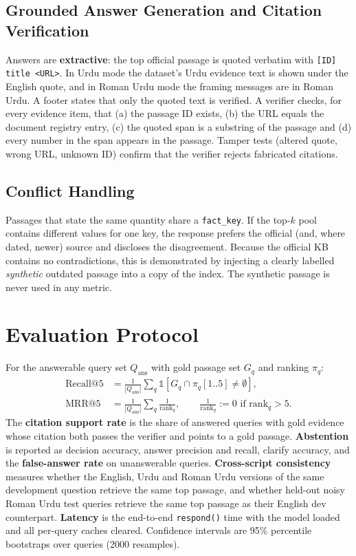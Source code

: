 \documentclass[12pt,a4paper]{article}
\begin{document}
\subsection{Grounded Answer Generation and Citation Verification}
Answers are \textbf{extractive}: the top official passage is quoted verbatim with
\texttt{[ID] title <URL>}. In Urdu mode the dataset's Urdu evidence text is shown under the English quote, and in Roman
Urdu mode the framing messages are in Roman Urdu. A footer states that only the quoted text is verified. A verifier checks,
for every evidence item, that (a) the passage ID exists, (b) the URL equals the document registry entry, (c) the quoted span
is a substring of the passage and (d) every number in the span appears in the passage. Tamper tests (altered quote, wrong
URL, unknown ID) confirm that the verifier rejects fabricated citations.

\subsection{Conflict Handling}
Passages that state the same quantity share a \texttt{fact\_key}. If the top-$k$ pool contains different values for one key,
the response prefers the official (and, where dated, newer) source and discloses the disagreement. Because the official
KB contains no contradictions, this is demonstrated by injecting a clearly labelled \emph{synthetic} outdated passage into a
copy of the index. The synthetic passage is never used in any metric.

\section{Evaluation Protocol}
For the answerable query set $Q_{\text{ans}}$ with gold passage set $G_q$ and ranking $\pi_q$:
\begin{align}
\text{Recall@5} &= \frac{1}{|Q_{\text{ans}}|}\sum_{q} \mathbb{1}\left[G_q \cap \pi_q[1..5] \neq \emptyset\right], \\
\text{MRR@5} &= \frac{1}{|Q_{\text{ans}}|}\sum_{q} \frac{1}{\text{rank}_q}, \qquad \frac{1}{\text{rank}_q} := 0 \text{ if } \text{rank}_q > 5.
\end{align}
The \textbf{citation support rate} is the share of answered queries with gold evidence whose citation both passes the
verifier and points to a gold passage. \textbf{Abstention} is reported as decision accuracy, answer precision and recall,
clarify accuracy, and the \textbf{false-answer rate} on unanswerable queries. \textbf{Cross-script consistency} measures
whether the English, Urdu and Roman Urdu versions of the same development question retrieve the same top passage, and whether
held-out noisy Roman Urdu test queries retrieve the same top passage as their English dev counterpart. \textbf{Latency} is
the end-to-end \texttt{respond()} time with the model loaded and all per-query caches cleared. Confidence intervals are
95\% percentile bootstraps over queries (2000 resamples).
\end{document}
